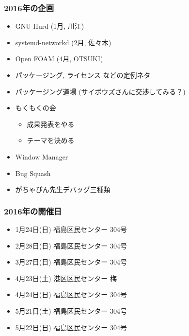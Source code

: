 \documentclass[cjk,dvipdfmx,10pt,compress,%
hyperref={bookmarks=true,bookmarksnumbered=true,bookmarksopen=false,%
colorlinks=false,%
pdftitle={第 105 回 関西 Debian 勉強会},%
pdfauthor={倉敷・のがた・佐々木・かわだ},%
pdfsubject={資料},%
}]{beamer}
\begin{document}
\begin{frame}
  \frametitle{2016年の企画}
  \begin{itemize}
  \item GNU Hurd (1月, 川江)
  \item systemd-networkd (2月, 佐々木)
  \item Open FOAM (4月, OTSUKI)
  \item パッケージング, ライセンス などの定例ネタ
  \item パッケージング道場 (サイボウズさんに交渉してみる？)
  \item もくもくの会
    \begin{itemize}
    \item 成果発表をやる
    \item テーマを決める
    \end{itemize}
  \item Window Manager
  \item Bug Squash
  \item がちゃぴん先生デバッグ三種類
  \end{itemize}
\end{frame}

\begin{frame}
  \frametitle{2016年の開催日}
  \begin{itemize}
  \item 1月24日({\color{red}日}) 福島区民センター 304号
  \item 2月28日({\color{red}日}) 福島区民センター 304号
  \item 3月27日({\color{red}日}) 福島区民センター 304号
  \item 4月23日({\color{blue}土}) 港区区民センター 梅
  \item 4月24日({\color{red}日}) 福島区民センター 304号
  \item 5月21日({\color{blue}土}) 福島区民センター 304号
  \item 5月22日({\color{red}日}) 福島区民センター 304号
  \end{itemize}
\end{frame}


\end{document}
